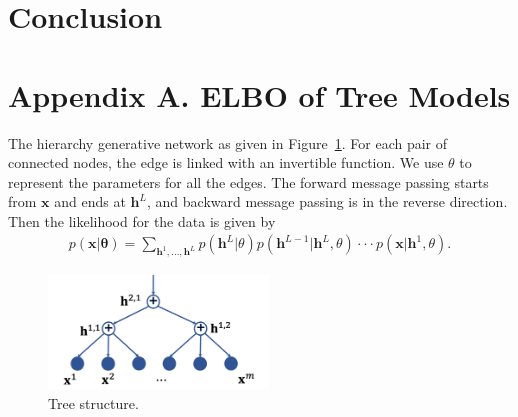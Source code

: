 \documentclass{article} %
\begin{document}
\vspace{-0.05in}
\section{Conclusion}\label{sec:conclusion}
\vspace{-0.05in}


\clearpage



\clearpage
\section*{Appendix A.  ELBO of Tree Models}\label{appd:tree_elbo}

The hierarchy generative network as given in Figure~\ref{fig:tree-d}. For each pair of connected nodes, the edge is linked with an invertible function. We use $\theta$ to represent the parameters for all the edges.
The forward message passing starts from $\mathbf{x}$ and ends at $\mathbf{h}^L$, and backward message passing is in the reverse direction. 
 Then the
 likelihood for the data is given by
\begin{align*}
p(\mathbf{x}| \mathbf{\theta}) = \sum_{\mathbf{h}^1, ..., \mathbf{h}^L} p(\mathbf{h}^L | \theta)p(\mathbf{h}^{L-1} | \mathbf{h}^{L},\theta) \cdot \cdot  \cdot  p(\mathbf{x} | \mathbf{h}^{1}, \theta) .
\end{align*}

\begin{figure}[!htbp]
    \centering
    \includegraphics[width=2.3in]{fig/tree_direct.png}
    \caption{Tree structure.}
    \label{fig:tree-d}
\end{figure}
\end{document}
